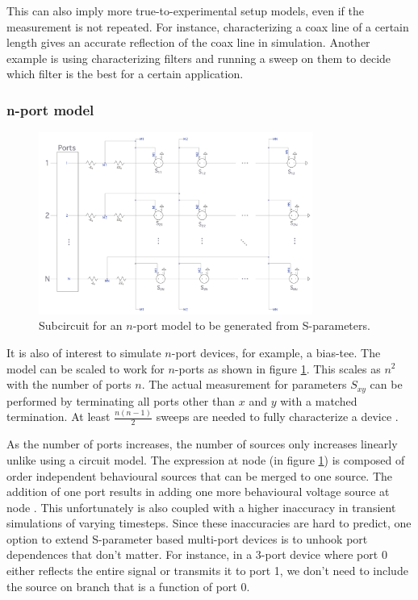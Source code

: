 This can also imply more true-to-experimental setup models, even if the measurement is not repeated.
For instance, characterizing a coax line of a certain length gives an accurate reflection of the coax line
in simulation. Another example is using characterizing filters and running a sweep on them to
decide which filter is the best for a certain application.

\subsubsection{n-port model}

\begin{figure}
    \centering
    \includegraphics[width=0.8\textwidth]{figs/nport.png}
    \caption{Subcircuit for an $n$-port model to be generated from S-parameters.}
    \label{fig:nport}
\end{figure}

It is also of interest to simulate $n$-port devices, for example, a bias-tee. 
The model can be
scaled to work for $n$-ports as shown in figure \ref{fig:nport}. This scales as $n^2$ with
the number of ports $n$. The actual measurement for parameters $S_{xy}$ can be performed 
by terminating all ports other than $x$ and $y$ with a matched termination. At least
$\frac{n(n-1)}{2}$ sweeps are needed to fully characterize a device \cite{measuring_nport}.

As the number of
ports increases, the number of sources only increases linearly unlike using a circuit 
model. The expression at node  (in figure \ref{fig:nport}) is composed of order independent behavioural
sources that can be merged to one source. The addition of one port results in
adding one more behavioural voltage source at node . 
This unfortunately is also coupled with a higher inaccuracy in transient simulations
of varying timesteps. Since these inaccuracies are hard to predict, one option to
extend S-parameter based multi-port devices is to unhook port dependences that don't
matter. For instance, in a 3-port device where port 0 either reflects the entire
signal or transmits it to port 1, we don't need to include the source on branch 
that is a function of port 0.

